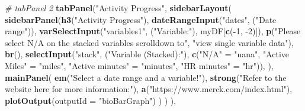 \documentclass[]{book}
\newenvironment{Shaded}{\begin{snugshade}}{\end{snugshade}}
\newcommand{\CommentTok}[1]{\textcolor[rgb]{0.56,0.35,0.01}{\textit{#1}}}
\newcommand{\DataTypeTok}[1]{\textcolor[rgb]{0.13,0.29,0.53}{#1}}
\newcommand{\DecValTok}[1]{\textcolor[rgb]{0.00,0.00,0.81}{#1}}
\newcommand{\KeywordTok}[1]{\textcolor[rgb]{0.13,0.29,0.53}{\textbf{#1}}}
\newcommand{\NormalTok}[1]{#1}
\newcommand{\OperatorTok}[1]{\textcolor[rgb]{0.81,0.36,0.00}{\textbf{#1}}}
\newcommand{\StringTok}[1]{\textcolor[rgb]{0.31,0.60,0.02}{#1}}
\begin{document}
\begin{Shaded}
\begin{Highlighting}[]
{{                         \CommentTok{# tabPanel 2}
                         \KeywordTok{tabPanel}\NormalTok{(}\StringTok{"Activity Progress"}\NormalTok{,}
                                  \KeywordTok{sidebarLayout}\NormalTok{(}
                                    \KeywordTok{sidebarPanel}\NormalTok{(}\KeywordTok{h3}\NormalTok{(}\StringTok{"Activity Progress"}\NormalTok{),}
                                                 \KeywordTok{dateRangeInput}\NormalTok{(}\StringTok{"dates"}\NormalTok{, (}\StringTok{"Date range"}\NormalTok{)),}
                                                 \KeywordTok{varSelectInput}\NormalTok{(}\StringTok{"variables1"}\NormalTok{, (}\StringTok{"Variable:"}\NormalTok{), myDF[}\KeywordTok{c}\NormalTok{(}\OperatorTok{-}\DecValTok{1}\NormalTok{, }\DecValTok{-2}\NormalTok{)]),}
                                                 \KeywordTok{p}\NormalTok{(}\StringTok{"Please select N/A on the stacked variables scrolldown to"}\NormalTok{,}
                                                   \StringTok{"view single variable data"}\NormalTok{), }\KeywordTok{br}\NormalTok{(),}
                                                 \KeywordTok{selectInput}\NormalTok{(}\StringTok{"stack"}\NormalTok{, (}\StringTok{"Variable (Stacked):"}\NormalTok{),}
                                                             \KeywordTok{c}\NormalTok{(}\StringTok{"N/A"}\NormalTok{ =}\StringTok{ "nana"}\NormalTok{, }\StringTok{"Active Miles"}\NormalTok{ =}\StringTok{ "miles"}\NormalTok{, }\StringTok{"Active minutes"}\NormalTok{ =}\StringTok{ "minutes"}\NormalTok{, }\StringTok{"HR minutes"}\NormalTok{ =}\StringTok{ "hr"}\NormalTok{)),}
\NormalTok{                                    ),}
                                    \KeywordTok{mainPanel}\NormalTok{(}
                                      \KeywordTok{em}\NormalTok{(}\StringTok{"Select a date range and a variable!"}\NormalTok{),}
                                      \KeywordTok{strong}\NormalTok{(}\StringTok{"Refer to the website here for more information:"}\NormalTok{),}
                                      \KeywordTok{a}\NormalTok{(}\StringTok{"https://www.merck.com/index.html"}\NormalTok{),}
                                      \KeywordTok{plotOutput}\NormalTok{(}\DataTypeTok{outputId =} \StringTok{"bioBarGraph"}\NormalTok{)}
\NormalTok{                                    )}
\NormalTok{                                  )}
\NormalTok{                         ),}
                         
}}
\end{Highlighting}
\end{Shaded}
\end{document}
